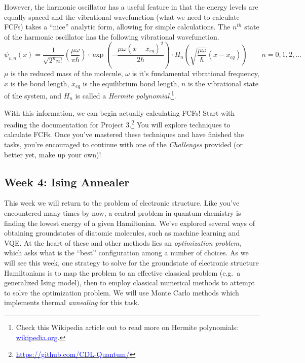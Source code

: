 \documentclass[12pt]{article}
\begin{document}
However, the harmonic oscillator has a useful feature in that the energy levels are equally spaced and the vibrational wavefunction (what we need to calculate FCFs) takes a ``nice'' analytic form, allowing for simple calculations. The $n^{th}$ state of the harmonic oscillator has the following vibrational wavefunction.
\begin{equation}
    \psi_{v,n}(x) = \frac{1}{\sqrt{2^nn!}}\left(\frac{\mu\omega}{\pi\hbar}\right)\cdot\exp\left(-\frac{\mu\omega (x-x_{eq})^2}{2\hbar}\right)\cdot H_n\left(\sqrt{\frac{\mu\omega}{\hbar}}(x-x_{eq})\right) \qquad n=0,1,2,...
\end{equation}
$\mu$ is the reduced mass of the molecule, $\omega$ is it's fundamental vibrational frequency, $x$ is the bond length, $x_{eq}$ is the equilibrium bond length, $n$ is the vibrational state of the system, and $H_n$ is called a {\it Hermite polynomial}.\footnote{Check this Wikipedia article out to read more on Hermite polynomials: \href{https://en.wikipedia.org/wiki/Hermite_polynomials}{\textcolor{blue}{wikipedia.org}}.}.

With this information, we can begin actually calculating FCFs! Start with reading the documentation for Project 3.\footnote{\href{https://github.com/CDL-Quantum/CohortProject_2020/tree/master/Project_3_Franck_Condon_Factors}
    {\textcolor{blue}{https://github.com/CDL-Quantum/}}}
You will explore techniques to calculate FCFs.
Once you've mastered these techniques and have finished the tasks, you're encouraged to continue with one of the {\it Challenges} provided (or better yet, make up your own)!

\subsection{Week 4: Ising Annealer}

This week we will return to the problem of electronic structure.  Like you've encountered many times by now, a central problem in quantum chemistry is finding the lowest 
energy of a given Hamiltonian.  We've explored several ways of obtaining groundstates of diatomic molecules, such as machine learning
and VQE.  At the heart of these and other methods lies an {\it optimization problem}, which asks what is the ``best'' configuration among a number of choices.
As we will see this week, one strategy to solve for the groundstate of electronic structure Hamiltonians is to map the problem to an effective classical problem
(e.g.~a generalized Ising model),
then to employ classical numerical methods to attempt to solve the optimization problem.  We will use Monte Carlo methods which implements thermal
{\it annealing} for this task.
\end{document}
